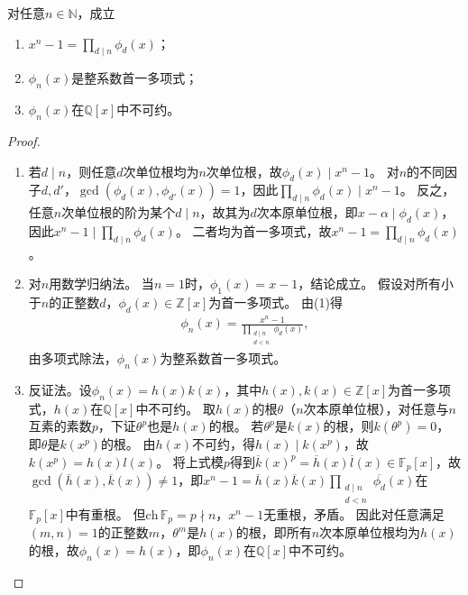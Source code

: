 \documentclass[../../main.tex]{subfiles}%
\begin{document}
\begin{theorem}
对任意$n\in\mathbb{N}$，成立
\begin{enumerate}[(1)]
\item $x^n-1=\prod\limits_{d\mid n}\phi_d(x)$；
\item $\phi_n(x)$是整系数首一多项式；
\item $\phi_n(x)$在$\mathbb{Q}[x]$中不可约。
\end{enumerate}
\end{theorem}
\begin{proof}
\begin{enumerate}[(1)]
\item 若$d\mid n$，则任意$d$次单位根均为$n$次单位根，故$\phi_d(x)\mid x^n-1$。
对$n$的不同因子$d,d'$，$\gcd(\phi_d(x),\phi_{d'}(x))=1$，因此$\prod\limits_{d\mid n}\phi_d(x)\mid x^n-1$。
反之，任意$n$次单位根的阶为某个$d\mid n$，故其为$d$次本原单位根，即$x-\alpha\mid\phi_d(x)$，因此$x^n-1\mid\prod\limits_{d\mid n}\phi_d(x)$。
二者均为首一多项式，故$x^n-1=\prod\limits_{d\mid n}\phi_d(x)$。

\item 对$n$用数学归纳法。
当$n=1$时，$\phi_1(x)=x-1$，结论成立。
假设对所有小于$n$的正整数$d$，$\phi_d(x)\in\mathbb{Z}[x]$为首一多项式。
由(1)得
\begin{align*}
\phi_n(x)=\frac{x^n-1}{\prod\limits_{\substack{d\mid n\\d<n}}\phi_d(x)},
\end{align*}
由多项式除法，$\phi_n(x)$为整系数首一多项式。

\item 反证法。设$\phi_n(x)=h(x)k(x)$，其中$h(x),k(x)\in\mathbb{Z}[x]$为首一多项式，$h(x)$在$\mathbb{Q}[x]$中不可约。
取$h(x)$的根$\theta$（$n$次本原单位根），对任意与$n$互素的素数$p$，下证$\theta^p$也是$h(x)$的根。
若$\theta^p$是$k(x)$的根，则$k(\theta^p)=0$，即$\theta$是$k(x^p)$的根。
由$h(x)$不可约，得$h(x)\mid k(x^p)$，故$k(x^p)=h(x)l(x)$。
将上式模$p$得到$\overline{k}(x)^p=\overline{h}(x)\overline{l}(x)\in\mathbb{F}_p[x]$，故$\gcd(\overline{h}(x),\overline{k}(x))\neq1$，即$x^n-1=\overline{h}(x)\overline{k}(x)\prod\limits_{\substack{d\mid n\\d<n}}\overline{\phi_d}(x)$在$\mathbb{F}_p[x]$中有重根。
但$\mathrm{ch}\,\mathbb{F}_p=p\nmid n$，$x^n-1$无重根，矛盾。
因此对任意满足$(m,n)=1$的正整数$m$，$\theta^m$是$h(x)$的根，即所有$n$次本原单位根均为$h(x)$的根，故$\phi_n(x)=h(x)$，即$\phi_n(x)$在$\mathbb{Q}[x]$中不可约。
\end{enumerate}
\end{proof}
\end{document}
